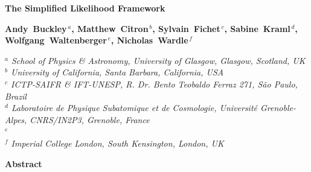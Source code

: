 \documentclass[11pt]{article}
\begin{document}
\vspace*{30mm}

\begin{center}
{\LARGE \bf The Simplified Likelihood Framework
}
\par\vspace*{20mm}\par

{\large \bf Andy~Buckley$^{\,a}$, Matthew~Citron$^{\,b}$,  Sylvain~Fichet$^{\,c}$, Sabine~Kraml$^{\,d}$, Wolfgang~Waltenberger$^{\,e}$, Nicholas~Wardle$^{\,f}$}

\bigskip

{\em $^a$ School of Physics \& Astronomy, University of Glasgow, Glasgow, Scotland, UK}
\\
{\em $^b$ University of California, Santa Barbara, California, USA}
\\
{\em $^c$ ICTP-SAIFR \& IFT-UNESP, R. Dr. Bento Teobaldo Ferraz 271, S\~ao Paulo, Brazil}
\\
{\em $^d$ Laboratoire de Physique Subatomique et de Cosmologie, Universit\'e Grenoble-Alpes, CNRS/IN2P3, Grenoble, France  }
\\
{\em $^e$ }
\\
{\em $^f$ Imperial College London, South Kensington, London, UK }
\vspace*{5mm}



\vspace*{15mm}

{  \bf  Abstract }

\end{center}
\vspace*{1mm}



\noindent
\begin{abstract}

We present the Simplified Likelihood framework, a systematic approximation scheme  for experimental likelihoods such as those originating from LHC experiments.
We present an efficient method to compute the parameters of the simplified likelihood  from Monte Carlo simulations. The approach is validated using a realistic LHC-like analysis, and the limits of the approximation are explored.
 The simplified likelihood data can be conveniently released in the  HepData error source format and automatically built from it, making this framework a convenient %
  tool to transmit realistic experimental likelihoods to the community.




\end{abstract}
\end{document}
